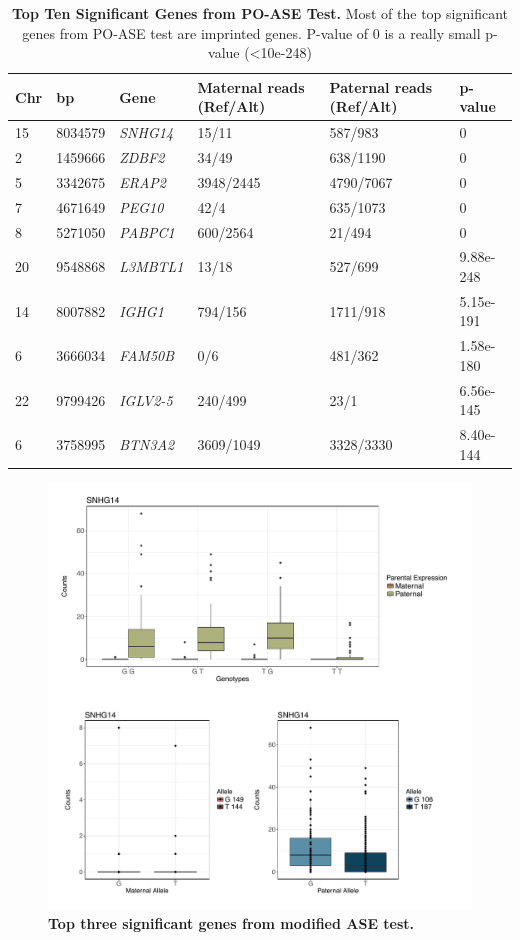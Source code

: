 \begin{table}
\centering
\begin{adjustbox}{width={\textwidth}}
\begin{tabular}{@{}p{3cm}p{3cm}p{3cm}p{3cm}p{3cm}p{3cm}@{}}
 \toprule  Chr & bp & Gene & Maternal reads (Ref/Alt) & Paternal reads (Ref/Alt) & p-value \\ \midrule
15 & 8034579 & \emph{SNHG14} & 15/11  & 587/983 & 0 \\
2 & 1459666  & \emph{ZDBF2} & 34/49  & 638/1190 & 0\\
5 & 3342675 & \emph{ERAP2} & 3948/2445 & 4790/7067 & 0\\
7 & 4671649 &  \emph{PEG10} & 42/4  & 635/1073 & 0 \\
8 & 5271050 & \emph{PABPC1} & 600/2564 & 21/494 & 0 \\
20 & 9548868 & \emph{L3MBTL1} & 13/18 & 527/699 & 9.88e-248 \\
14 & 8007882 & \emph{IGHG1} &   794/156  & 1711/918 & 5.15e-191\\
6 & 3666034 & \emph{FAM50B} & 0/6 & 481/362 & 1.58e-180\\
22 & 9799426 & \emph{IGLV2-5} & 240/499 & 23/1 & 6.56e-145\\
6 & 3758995 & \emph{BTN3A2} & 3609/1049  & 3328/3330 &  8.40e-144\\  \bottomrule
\end{tabular}
\end{adjustbox}
\caption[Top Ten Significant Genes from PO-ASE Test.]{\textbf{Top Ten Significant Genes from PO-ASE Test.} Most of the top significant genes from PO-ASE test are imprinted genes. P-value of 0 is a really small p-value (\textless 10e-248)}
\label{tab:poase1}
\end{table}


\begin{figure}[!htb]
\centering \includegraphics[width=5in]{img/ch04/fig-08-SNHG14.pdf}
\caption[Top three significant genes from modified ASE test.]{\textbf{Top three significant genes from modified ASE test.} }
\label{fig:SNHG14}
\end{figure}

